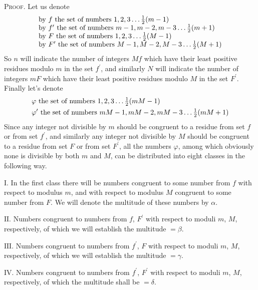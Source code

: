 \documentclass[twoside,12pt, showframe]{memoir}
\let\oldfrac\frac
\def\frac#1#2{\mathchoice{\tfrac{#1}{#2}}{\oldfrac{#1}{#2}}{\genfrac{}{}{}{2}{#1}{#2\mathstrut}}{\genfrac{}{}{}{3}{#1}{#2\mathstrut}}}
\begin{document}
\textsc{Proof.} Let us denote
\[\begin{array}{l}
\text{by }f\text{ the set of numbers }1,2,3 \ldots \frac{1}{2}(m-1) \\
\text{by }f^{\prime}\text{ the set of numbers }m-1, m-2, m-3 \ldots \frac{1}{2}(m+1) \\
\text{by }F\text{ the set of numbers }1,2,3 \ldots \frac{1}{2}({M}-1) \\
\text{by }F^{\prime}\text{ the set of numbers }M-1, M-2, M-3 \ldots \frac{1}{2}(M+1)\\ 
\end{array}\]
So \(n\) will indicate the number of integers \(M f\) which have their least positive residues modulo \(m\) in the set \(f^{\prime}\), and similarly \(N\) will indicate the number of integers \(m F\) which have their least positive residues modulo \(M\) in the set \(F^{\prime}\). Finally let's denote\\
\[\begin{aligned}
&\varphi\text{ the set of numbers }1, 2, 3 \ldots \frac{1}{2}(m M-1)\\
&\varphi^{\prime}\text{ the set of numbers }m M-1, m M-2, m M-3 \ldots \frac{1}{2}(m M+1)
\end{aligned}\]
Since any integer not divisible by \(m\) should be congruent to a residue from set \(f\) or from set \(f^{\prime}\), and similarly any integer not divisible by \(M\) should be congruent to a residue from set \(F\) or from set \(F^{\prime}\), all the numbers \(\varphi\), among which obviously none is divisible by both \(m\) and \(M\), can be distributed into eight classes in the following way.
%

\(\text{I.}\) In the first class there will be numbers congruent to some number from \(f\) with respect to modulus \(m\), and with respect to modulus \(M\) congruent to some number from \(F\). We will denote the multitude of these numbers by \(\alpha\).\clearpage\noindent%

\(\text{II.}\) Numbers congruent to numbers from \(f\), \(F^{\prime}\) with respect to moduli \(m\), \(M\), respectively, of which we will establish the multitude \(=\beta\).

\(\text{III.}\) Numbers congruent to numbers from \(f^{\prime}\), \(F\) with respect to moduli \(m\), \(M\), respectively, of which we will establish the multitude \(=\gamma\).

\(\text{IV.}\) Numbers congruent to numbers from \(f^{\prime}\), \(F^{\prime}\) with respect to moduli \(m\), \(M\), respectively, of which the multitude shall be \(=\delta\).
\end{document}
